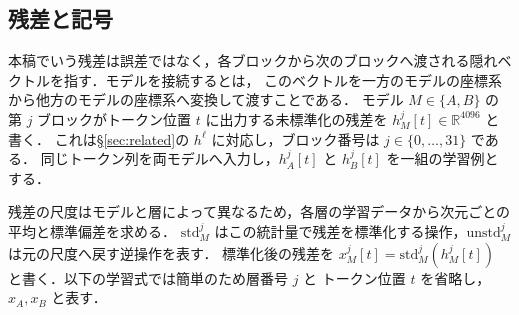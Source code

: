 \documentclass[techrep,noauthor]{ipsj}
\begin{document}
\subsection{残差と記号}\label{sec:notation}
本稿でいう残差は誤差ではなく，各ブロックから次のブロックへ渡される隠れベクトルを指す．モデルを接続するとは，
このベクトルを一方のモデルの座標系から他方のモデルの座標系へ変換して渡すことである．
モデル $M\in\{A,B\}$ の第 $j$ ブロックがトークン位置 $t$ に出力する未標準化の残差を $h_M^j[t]\in\mathbb R^{4096}$ と書く．
これは\S\ref{sec:related}の $h^{\ell}$ に対応し，ブロック番号は $j\in\{0,\ldots,31\}$ である．
同じトークン列を両モデルへ入力し，$h_A^j[t]$ と $h_B^j[t]$ を一組の学習例とする．

残差の尺度はモデルと層によって異なるため，各層の学習データから次元ごとの平均と標準偏差を求める．
$\mathrm{std}_M^j$ はこの統計量で残差を標準化する操作，$\mathrm{unstd}_M^j$ は元の尺度へ戻す逆操作を表す．
標準化後の残差を $x_M^j[t]=\mathrm{std}_M^j(h_M^j[t])$ と書く．以下の学習式では簡単のため層番号 $j$ と
トークン位置 $t$ を省略し，$x_A,x_B$ と表す．
\end{document}
